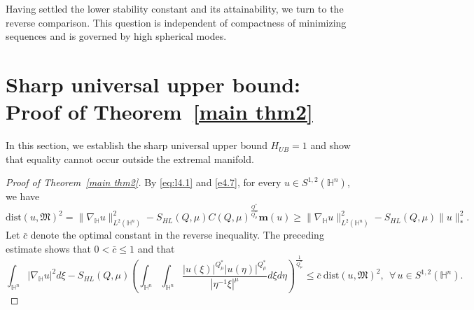 \documentclass[11pt]{article}
\begin{document}
Having settled the lower stability constant and its attainability, we turn to the reverse comparison. This question is independent of compactness of minimizing sequences and is governed by high spherical modes.

\section{\texorpdfstring{{Sharp universal upper bound: Proof of Theorem~\ref{main thm2}}}{Sharp universal upper bound: Proof of Theorem 3.3}}\label{sec6}

In this section, we establish the sharp universal upper bound $H_{UB}=1$ and show that equality cannot occur outside the extremal manifold.

\begin{proof}
[Proof of Theorem~\ref{main thm2}]
{By \eqref{eq:l4.1} and \eqref{e4.7}, for every $u\in S^{1,2}(\mathbb H^n)$, we have}
\begin{equation*}
 \mathrm{dist}(u,\mathfrak{M})^2=\|\nabla_\mathbb{H} u\|_{L^2(\mathbb{H}^n)}^2-S_{HL}(Q,\mu)C(Q,\mu)^{\frac{Q^{\ast}}{Q^{\ast}_{\mu}}}\mathbf{m}(u)\geq
 \|\nabla_\mathbb{H} u\|_{L^2(\mathbb{H}^n)}^2-S_{HL}(Q,\mu) \|u\|_*^2.
\end{equation*}
{Let $\bar c$ denote the optimal constant in the reverse inequality. The preceding estimate shows that $0<\bar c\leq1$ and that}
\begin{equation}\label{uppmini}
 \int_{\mathbb{H}^{n}}|\nabla_{\mathbb{H}} u|^{2}{d}\xi-S_{HL}(Q,\mu) \left(\int_{\mathbb{H}^{n}}\int_{\mathbb{H}^{n}}\frac{|u(\xi)|^{Q^{\ast}_{\mu}}|u(\eta)|
^{Q^{\ast}_{\mu}}}{|\eta^{-1}\xi|^{\mu}}{d}\xi{d}\eta\right)^{\frac{1}{Q^{\ast}_{\mu}}}\leq \bar{c}\ \mathrm{dist}(u,\mathfrak{M})^2,\ \ \forall \, u\in S^{1,2}(\mathbb{H}^{n}).
\end{equation}


\end{proof}
\end{document}
